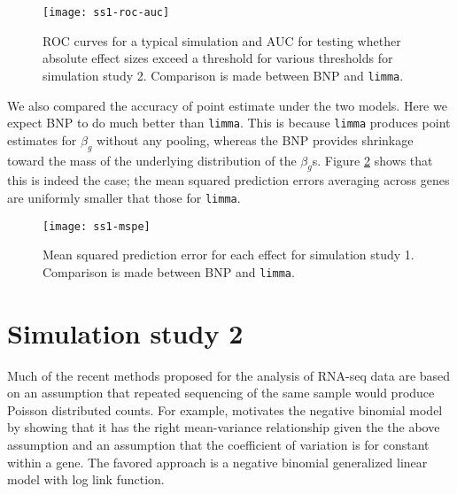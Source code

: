 \begin{figure}[h!]
\centering
\texttt{[image: ss1-roc-auc]}
\caption{ROC curves for a typical simulation and AUC for testing whether absolute effect sizes exceed a threshold for various thresholds for simulation study 2. Comparison is made between BNP and \texttt{limma}.}
\label{roc-ss1}
\end{figure}

We also compared the accuracy of point estimate under the two models. Here we expect BNP to do much better than \texttt{limma}. This is because \texttt{limma} produces point estimates for $\beta_g$ without any pooling, whereas the BNP provides shrinkage toward the mass of the underlying distribution of the $\beta_g$s. Figure \ref{mspe-ss1} shows that this is indeed the case; the mean squared prediction errors averaging across genes are uniformly smaller that those for \texttt{limma}.

\begin{figure}[h!]
\centering
\texttt{[image: ss1-mspe]}
\caption{Mean squared prediction error for each effect for simulation study 1. Comparison is made between BNP and \texttt{limma}.}
\label{mspe-ss1}
\end{figure}

\section{Simulation study 2}
Much of the recent methods proposed for the analysis of RNA-seq data are based on an assumption that repeated sequencing of the same sample would produce Poisson distributed counts. For example, \cite{mccarthy} motivates the negative binomial model by showing that it has the right mean-variance relationship given the the above assumption and an assumption that the coefficient of variation is for constant within a gene. The favored approach is a negative binomial generalized linear model with log link function.

